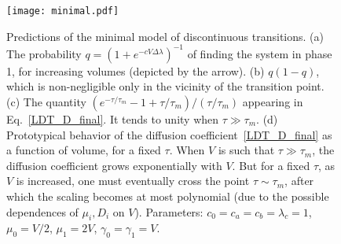 \documentclass[aps,pre,reprint, amsmath, amssymb,superscriptaddress]{revtex4-1}
\begin{document}
\begin{figure}
    \centering
    \texttt{[image: minimal.pdf]}
    \caption{Predictions of the minimal model of discontinuous transitions.
    (a) The probability $q = (1+e^{-c V \Delta \lambda})^{-1}$ of finding the system in phase 1, for increasing volumes (depicted by the arrow). 
    (b) $q(1-q)$, which is non-negligible only in the vicinity of the transition point. 
    (c) The quantity 
    $(e^{- \tau/\tau_m} - 1 + \tau/\tau_m)/(\tau/\tau_m)$ appearing in Eq.~\eqref{LDT_D_final}. It tends to unity when $\tau\gg \tau_m$. 
    (d) Prototypical behavior of the diffusion coefficient~\eqref{LDT_D_final} as a function of volume, for a fixed $\tau$. 
    When $V$ is such that $\tau \gg \tau_m$, the diffusion coefficient grows exponentially with $V$. 
    But for a fixed $\tau$, as $V$ is increased, one must eventually cross the point $\tau \sim \tau_m$, after which the scaling becomes at most polynomial (due to the possible dependences of $\mu_i, D_i$ on $V$). 
    Parameters: $c_0 = c_a = c_b = \lambda_c = 1$, $\mu_0 = V/2$, $\mu_1 = 2V$, $\gamma_0 = \gamma_1 = V$. 
    }
    \label{fig:minimal}
\end{figure}
\end{document}
